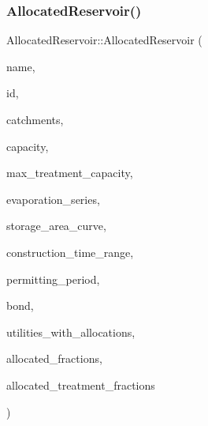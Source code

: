 \mbox{\label{classAllocatedReservoir_a22794afc1f06d13fc3099015a2250b0d}} 
\subsubsection{\texorpdfstring{Allocated\+Reservoir()}{AllocatedReservoir()}\hspace{0.1cm}{\footnotesize\ttfamily [2/5]}}
{\footnotesize\ttfamily Allocated\+Reservoir\+::\+Allocated\+Reservoir (\begin{DoxyParamCaption}\item[{const char $\ast$}]{name,  }\item[{const int}]{id,  }\item[{const vector$<$ \mbox{\hyperlink{classCatchment}{Catchment}} $\ast$$>$ \&}]{catchments,  }\item[{const double}]{capacity,  }\item[{const double}]{max\+\_\+treatment\+\_\+capacity,  }\item[{\mbox{\hyperlink{classEvaporationSeries}{Evaporation\+Series}} \&}]{evaporation\+\_\+series,  }\item[{\mbox{\hyperlink{classDataSeries}{Data\+Series}} $\ast$}]{storage\+\_\+area\+\_\+curve,  }\item[{const vector$<$ double $>$ \&}]{construction\+\_\+time\+\_\+range,  }\item[{double}]{permitting\+\_\+period,  }\item[{\mbox{\hyperlink{classBond}{Bond}} \&}]{bond,  }\item[{vector$<$ int $>$ $\ast$}]{utilities\+\_\+with\+\_\+allocations,  }\item[{vector$<$ double $>$ $\ast$}]{allocated\+\_\+fractions,  }\item[{vector$<$ double $>$ $\ast$}]{allocated\+\_\+treatment\+\_\+fractions }\end{DoxyParamCaption})}

\mbox{\label{classAllocatedReservoir_a17a60d40d936b1a68459d0bd9578aada}} 
